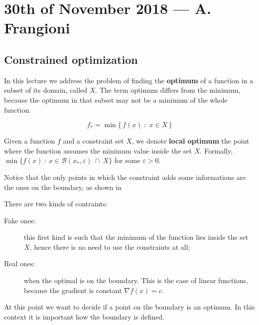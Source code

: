 \documentclass[ComputationalMathematics.tex]{subfiles}
\begin{document}
\section{30th of November 2018 --- A. Frangioni}

\subsection{Constrained optimization}
In this lecture we address the problem of finding the \textbf{optimum} of a function in a subset of its domain, called $X$. The term optimum differs from the minimum, because the optimum in that subset may not be a minimum of the whole function.

$$f_* = \min \{ \, f(x) \;:\; x \in X \, \}$$

\begin{definition}
  Given a function $f$ and a constraint set $X$, we denote \textbf{local optimum} the point where the function assumes the minimum value inside the set $X$. Formally,
$\min \{f(x)~:~x \in \mathcal{B}(x_*,\varepsilon)~\cap~ X\}$ for some $\varepsilon > 0$.
\end{definition}

Notice that the only points in which the constraint adds some informations are the ones on the boundary, as shown in 



There are two kinds of contraints:
\begin{description}
  \item[{\sc Fake ones:}] this first kind is such that the minimum of the function lies inside the set $X$, hence there is no need to use the constraints at all;
  \item[{\sc Real ones:}] when the optimal is on the boundary. This is the case of linear functions, because the gradient is constant $\nabla f(x) = c$.
\end{description}

At this point we want to decide if a point on the boundary is an optimum. In this context it is important how the boundary is defined.
\end{document}
